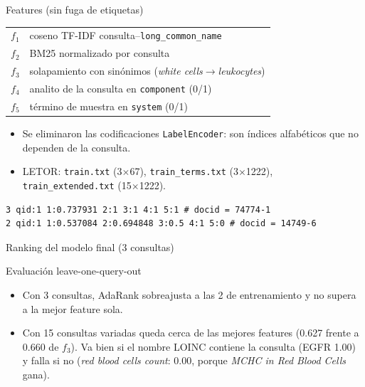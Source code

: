 \documentclass[aspectratio=169,11pt]{beamer}
\newcommand{\code}[1]{\texttt{#1}}
\begin{document}
\begin{frame}[fragile]{Features (sin fuga de etiquetas)}
  \begin{tabular}{>{\bfseries}l l}
    \toprule
    $f_1$ & coseno TF-IDF consulta--\code{long\_common\_name} \\
    $f_2$ & BM25 normalizado por consulta \\
    $f_3$ & solapamiento con sinónimos (\emph{white cells}$\to$\emph{leukocytes}) \\
    $f_4$ & analito de la consulta en \code{component} (0/1) \\
    $f_5$ & término de muestra en \code{system} (0/1) \\
    \bottomrule
  \end{tabular}
  \vspace{6pt}
  \begin{itemize}\small
    \item Se eliminaron las codificaciones \code{LabelEncoder}: son índices alfabéticos que no dependen de la consulta.
    \item LETOR: \code{train.txt} (3$\times$67), \code{train\_terms.txt} (3$\times$1222), \code{train\_extended.txt} (15$\times$1222).
  \end{itemize}
  \vspace{-4pt}
  \begin{lstlisting}
3 qid:1 1:0.737931 2:1 3:1 4:1 5:1 # docid = 74774-1
2 qid:1 1:0.537084 2:0.694848 3:0.5 4:1 5:0 # docid = 14749-6
  \end{lstlisting}
\end{frame}

\begin{frame}{Ranking del modelo final (3 consultas)}
  \centering\scriptsize
  \resizebox{!}{0.8\textheight}{}
\end{frame}

\begin{frame}{Evaluación leave-one-query-out}
  \centering\scriptsize
  \resizebox{\linewidth}{!}{}
  \vspace{4pt}
  \begin{itemize}\small
    \item Con 3 consultas, AdaRank sobreajusta a las 2 de entrenamiento y no supera a la mejor feature sola.
    \item Con 15 consultas variadas queda cerca de las mejores features (0.627 frente a 0.660 de $f_3$). Va bien si el nombre LOINC
      contiene la consulta (EGFR 1.00) y falla si no (\emph{red blood cells count}: 0.00, porque \emph{MCHC in Red Blood Cells} gana).
  \end{itemize}
\end{frame}
\end{document}
